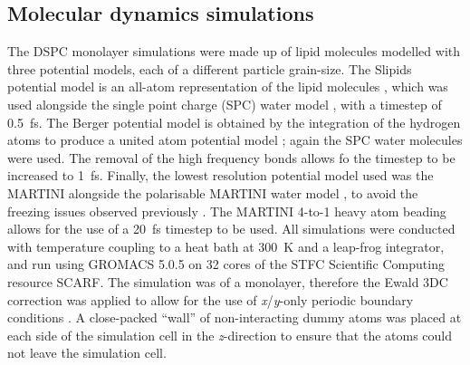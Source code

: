 \documentclass[amsmath,amssymb,twocolumn,superscriptaddress,aps,prl]{revtex4-1}
\begin{document}
\subsection{Molecular dynamics simulations}
The DSPC monolayer simulations were made up of lipid molecules modelled with three potential models, each of a different particle grain-size.
The Slipids potential model is an all-atom representation of the lipid molecules \cite{Jambeck2012}, which was used alongside the single point charge (SPC) water model \cite{Berendsen1987}, with a timestep of \SI{0.5}{\femto\second}.
The Berger potential model is obtained by the integration of the hydrogen atoms to produce a united atom potential model \cite{Berger1997}; again the SPC water molecules were used.
The removal of the high frequency  bonds allows fo the timestep to be increased to \SI{1}{\femto\second}.
Finally, the lowest resolution potential model used was the MARTINI \cite{Marrink2007} alongside the polarisable MARTINI water model \cite{Yesylevskyy2010}, to avoid the freezing issues observed previously \cite{Koutsioubas2016}.
The MARTINI 4-to-1 heavy atom beading allows for the use of a \SI{20}{\femto\second} timestep to be used.
All simulations were conducted with temperature coupling to a heat bath at \SI{300}{\kelvin} and a leap-frog integrator, and run using GROMACS 5.0.5 \cite{Berendsen1995,Lindahl2001,vanderSpoel2005,Hess2008} on 32 cores of the STFC Scientific Computing resource SCARF.
The simulation was of a monolayer, therefore the Ewald 3DC correction was applied to allow for the use of \emph{x}/\emph{y}-only periodic boundary conditions \cite{InChul1999}.
A close-packed ``wall'' of non-interacting dummy atoms was placed at each side of the simulation cell in the \emph{z}-direction to ensure that the atoms could not leave the simulation cell.
\end{document}
